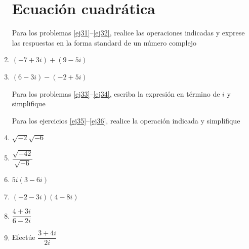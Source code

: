 \documentclass[twoside,letterpaper]{article}
\begin{document}
\begin{multicols}{2}
\begin{enumerate}
\section*{Ecuación cuadrática}
Para los problemas \ref{ej31}--\ref{ej32}, realice las operaciones indicadas y exprese las respuestas en la forma standard de un número complejo
\item \label{ej31} $(-7+3i)+(9-5i)$
\item \label{ej32} $(6-3i)-(-2+5i)$

Para los problemas \ref{ej33}--\ref{ej34}, escriba la expresión en término de $i$ y simplifique
Para los ejercicios \ref{ej35}--\ref{ej36}, realice la operación indicada y simplifique
\item \label{ej35} $\sqrt{-2}\sqrt{-6}$
\item $\dfrac{\sqrt{-42}}{\sqrt{-6}}$
\item $5i(3-6i)$
\item $(-2-3i)(4-8i)$
\item \label{ej36} $\dfrac{4+3i}{6-2i}$
\item Efectúe $\dfrac{3+4i}{2i}$


\end{enumerate}
\end{multicols}
\end{document}
